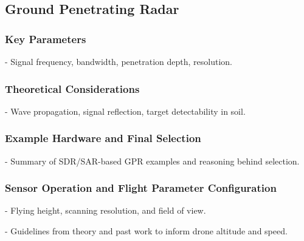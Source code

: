 \subsection{Ground Penetrating Radar}

\subsubsection{Key Parameters}
- Signal frequency, bandwidth, penetration depth, resolution.

\subsubsection{Theoretical Considerations}
- Wave propagation, signal reflection, target detectability in soil.

\subsubsection{Example Hardware and Final Selection}
- Summary of SDR/SAR-based GPR examples and reasoning behind selection.

\subsubsection{Sensor Operation and Flight Parameter Configuration}
- Flying height, scanning resolution, and field of view.

- Guidelines from theory and past work to inform drone altitude and speed.